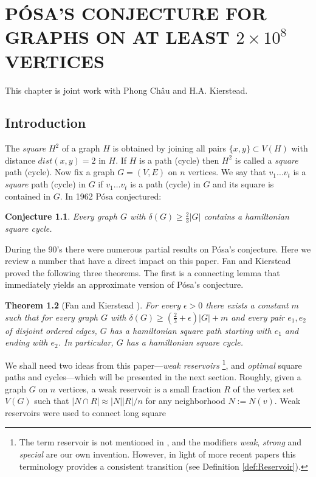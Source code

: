 \documentclass[oneside,12pt]{memoir}
\newtheorem{theorem}{Theorem}[section]
\newtheorem{conjecture}[theorem]{Conjecture}
\newcommand{\ep}{\epsilon}
\newcommand{\n}{2\times 10^8}
\begin{document}
\chapter{P\'OSA'S CONJECTURE FOR GRAPHS ON AT LEAST $\n$ VERTICES}\label{posachapter}
\DoubleSpacing
\setlength{\parindent}{.5in}

This chapter is joint work with Phong Ch\^au and H.A. Kierstead.  

\section{Introduction}

The \emph{square} $H^{2}$ of a graph $H$ is obtained by joining
all pairs $\{x,y\}\subset V(H)$ with distance $dist(x,y)=2$ in $H$.
If $H$ is a path (cycle) then $H^{2}$ is called a \emph{square}
path (cycle). Now fix a graph $G=(V,E)$ on $n$ vertices. We say
that $v_{1}\dots v_{t}$ is a \emph{square} path (cycle) in $G$ if
$v_{1}\dots v_{t}$ is a path (cycle) in $G$ and its square is contained
in $G$. In 1962 P\'osa \cite{E} conjectured: 
\begin{conjecture}
Every graph $G$ with $\delta(G)\ge\frac{2}{3}|G|$ contains a hamiltonian
square cycle. 
\end{conjecture}
During the 90's there were numerous partial results on P\'osa's conjecture.
Here we review a number that have a direct impact on this paper. Fan
and Kierstead \cite{FK1,FK2,FK3} proved the following three theorems. 
The first is a connecting lemma that
immediately yields an approximate version of P\'osa's conjecture. 
\begin{theorem}[Fan
and Kierstead \cite{FK1}]
\label{thm:FK1}For every $\ep>0$ there exists a constant $m$ such that for
every graph $G$ with $\delta(G)\ge(\frac{2}{3}+\ep)|G|+m$
and every pair $e_{1},e_{2}$ of disjoint ordered edges, $G$ has a hamiltonian 
square path starting with $e_{1}$ and ending with $e_{2}$. In particular,
$G$ has a hamiltonian square cycle.
\end{theorem}
We shall need two ideas from this paper---\emph{weak reservoirs}
\footnote{The term reservoir is not mentioned in \cite{FK1}, and the modifiers
\emph{weak}, \emph{strong }and \emph{special} are our own invention.
However, in light of more recent papers this terminology provides
a consistent transition (see Definition \ref{def:Reservoir}).
}, and \emph{optimal} square paths and cycles---which will be presented
in the next section. Roughly, given a graph $G$ on $n$ vertices, a weak reservoir is a small fraction $R$ of the vertex set $V(G)$  such that  $|N\cap R|\approx |N||R|/n$ for any neighborhood $N:=N(v)$.  Weak reservoirs were used to connect long square 
\end{document}
